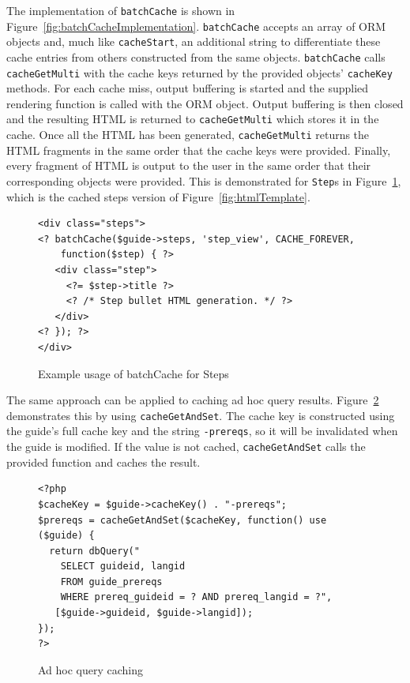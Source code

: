 \documentclass[12pt]{ucthesis}
\begin{document}
The implementation of {\tt batchCache} is shown in Figure~\ref{fig:batchCacheImplementation}.
{\tt batchCache} accepts an array of ORM objects and, much like {\tt cacheStart}, an additional string to differentiate these cache entries from others constructed from the same objects.
{\tt batchCache} calls {\tt cacheGetMulti} with the cache keys returned by the provided objects' {\tt cacheKey} methods.
For each cache miss, output buffering is started and the supplied rendering function is called with the ORM object.
Output buffering is then closed and the resulting HTML is returned to {\tt cacheGetMulti} which stores it in the cache.
Once all the HTML has been generated, {\tt cacheGetMulti} returns the HTML fragments in the same order that the cache keys were provided.
Finally, every fragment of HTML is output to the user in the same order that their corresponding objects were provided.
This is demonstrated for {\tt Step}s in Figure~\ref{fig:batchCacheStep}, which is the cached steps version of Figure~\ref{fig:htmlTemplate}.

\begin{figure}[h]
\begin{ssp}
\begin{verbatim}
<div class="steps">
<? batchCache($guide->steps, 'step_view', CACHE_FOREVER,
    function($step) { ?>
   <div class="step">
     <?= $step->title ?>
     <? /* Step bullet HTML generation. */ ?>
   </div>
<? }); ?>
</div>
\end{verbatim}
\caption{Example usage of batchCache for Steps}
\label{fig:batchCacheStep}
\end{ssp}
\end{figure}

The same approach can be applied to caching ad hoc query results.
Figure~\ref{fig:adHocQueryCaching} demonstrates this by using {\tt cacheGetAndSet}.
The cache key is constructed using the guide's full cache key and the string {\tt -prereqs}, so it will be invalidated when the guide is modified.
If the value is not cached, {\tt cacheGetAndSet} calls the provided function and caches the result.

\begin{figure}[h]
\begin{ssp}
\begin{verbatim}
<?php
$cacheKey = $guide->cacheKey() . "-prereqs";
$prereqs = cacheGetAndSet($cacheKey, function() use ($guide) {
  return dbQuery("
    SELECT guideid, langid
    FROM guide_prereqs
    WHERE prereq_guideid = ? AND prereq_langid = ?",
   [$guide->guideid, $guide->langid]);
});
?>
\end{verbatim}
\caption{Ad hoc query caching}
\label{fig:adHocQueryCaching}
\end{ssp}
\end{figure}
\end{document}
